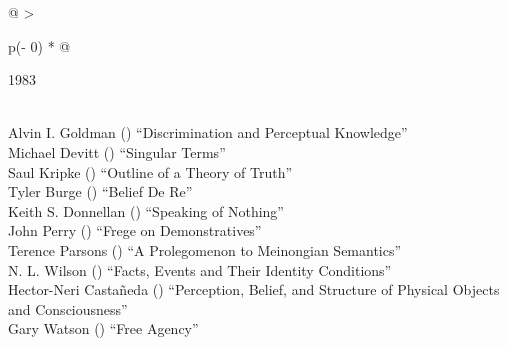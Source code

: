 \documentclass[
  10pt,
  letterpaper,
  DIV=11,
  numbers=noendperiod,
  twoside]{scrartcl}
\begin{document}
\begin{longtable}[]{@{}
  >{\raggedright\arraybackslash}p{(\columnwidth - 0\tabcolsep) * }@{}}

\caption{\label{tbl-top-ten-1974}Most cited articles published less than
ten years ago as of 1983.}

\tabularnewline

\toprule\noalign{}
\begin{minipage}[b]{\linewidth}\raggedright
1983
\end{minipage} \\
\midrule\noalign{}
\endhead
\bottomrule\noalign{}
\endlastfoot
Alvin I. Goldman
()
``Discrimination and Perceptual Knowledge'' \\
Michael Devitt
()
``Singular Terms'' \\
Saul Kripke
()
``Outline of a Theory of Truth'' \\
Tyler Burge
()
``Belief De Re'' \\
Keith S. Donnellan
()
``Speaking of Nothing'' \\
John Perry
()
``Frege on Demonstratives'' \\
Terence Parsons
()
``A Prolegomenon to Meinongian Semantics'' \\
N. L. Wilson
()
``Facts, Events and Their Identity Conditions'' \\
Hector-Neri Castañeda
()
``Perception, Belief, and Structure of Physical Objects and
Consciousness'' \\
Gary Watson
()
``Free Agency'' \\

\end{longtable}
\end{document}
